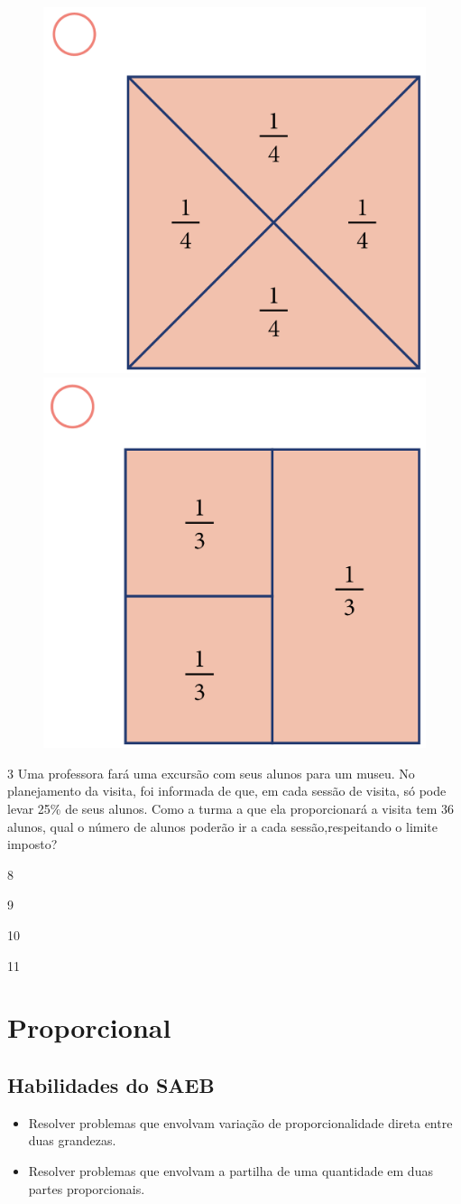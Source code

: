 \begin{figure}[htpb!]
\includegraphics[width=.35\textwidth]{../ilustracoes/MAT5/SAEB_5ANO_MAT_figura77-3.png}
\includegraphics[width=.35\textwidth]{../ilustracoes/MAT5/SAEB_5ANO_MAT_figura77-4.png}
\end{figure}

\num{3} Uma professora fará uma excursão com seus alunos para um museu. No
planejamento da visita, foi informada de que, em cada sessão de visita, só
pode levar 25\% de seus alunos. Como a turma a que ela proporcionará a
visita tem 36 alunos, qual o número de alunos poderão ir a cada sessão,respeitando o limite imposto?

\begin{minipage}{.5\textwidth}
\begin{escolha}
\item
  8
\item
  9
\item
  10
\item
  11
\end{escolha}
\end{minipage}


\chapter{Proporcional}

\section*{Habilidades do SAEB}

\begin{itemize}
\item Resolver problemas que envolvam variação de proporcionalidade direta
entre duas grandezas.

\item Resolver problemas que envolvam a partilha de uma quantidade em duas
partes proporcionais.
\end{itemize}

